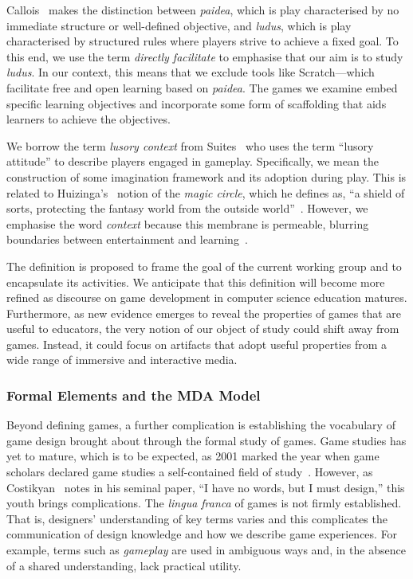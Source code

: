 \documentclass{sig-alternate-05-2015}
\begin{document}
Callois~\cite{caillois1961man} makes the distinction between {\em paidea}, which is play characterised by no immediate structure or well-defined objective, and {\em ludus}, which is play characterised by structured rules where players strive to achieve a fixed goal. To this end, we use the term {\em directly facilitate} to emphasise that our aim is to study {\em ludus}. In our context, this means that we exclude tools like Scratch---which facilitate free and open learning based on {\em paidea}. The games we examine embed specific learning objectives and incorporate some form of scaffolding that aids learners to achieve the objectives.



We borrow the term {\em lusory context} from Suites~\cite{suits2014grasshopper} who uses the term ``lusory attitude'' to describe players engaged in gameplay. Specifically, we mean the construction of some imagination framework and its adoption during play. This is related to Huizinga's~\cite{huizinga1955homo} notion of the {\em magic circle}, which he defines as, ``a shield of sorts, protecting the fantasy world from the outside world''~\cite{castronova2008synthetic}. However, we emphasise the word {\em context} because this membrane is permeable, blurring boundaries between entertainment and learning~\cite{yee2006labor}.



The definition is proposed to frame the goal of the current working group and to encapsulate its activities. We anticipate that this definition will become more refined as discourse on game development in computer science education matures. Furthermore, as new evidence emerges to reveal the properties of games that are useful to educators, the very notion of our object of study could shift away from games. Instead, it could focus on artifacts that adopt useful properties from a wide range of immersive and interactive media.\subsubsection{Formal Elements and the MDA Model}


Beyond defining games, a further complication is establishing the vocabulary of game design brought about through the formal study of games. Game studies has yet to mature, which is to be expected, as 2001 marked the year when game scholars declared game studies a self-contained field of study~\cite{aarseth2001-gameStudiesYearOne}. However, as Costikyan~\cite{costikyan2002toward} notes in his seminal paper, ``I have no words, but I must design,'' this youth brings complications. The {\em lingua franca} of games is not firmly established. That is, designers' understanding of key terms varies and this complicates the communication of design knowledge and how we describe game experiences. For example, terms such as {\em gameplay} are used in ambiguous ways and, in the absence of a shared understanding, lack practical utility. 
\end{document}
